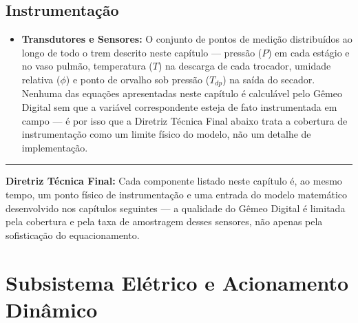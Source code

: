 \documentclass[12pt,a4paper]{article}
\numberwithin{equation}{section}
\numberwithin{table}{section}
\numberwithin{figure}{section}
\begin{document}
	\subsection{\textbf{Instrumentação}}
	\begin{itemize}
		\item \textbf{Transdutores e Sensores:} O conjunto de pontos de medição distribuídos ao longo de todo o trem descrito neste capítulo — pressão ($P$) em cada estágio e no vaso pulmão, temperatura ($T$) na descarga de cada trocador, umidade relativa ($\phi$) e ponto de orvalho sob pressão ($T_{dp}$) na saída do secador. Nenhuma das equações apresentadas neste capítulo é calculável pelo Gêmeo Digital sem que a variável correspondente esteja de fato instrumentada em campo — é por isso que a Diretriz Técnica Final abaixo trata a cobertura de instrumentação como um limite físico do modelo, não um detalhe de implementação.
	\end{itemize}

	\vspace{1em}
	\hrule
	\vspace{1em}

	\textbf{Diretriz Técnica Final:} Cada componente listado neste capítulo é, ao mesmo tempo, um ponto físico de instrumentação e uma entrada do modelo matemático desenvolvido nos capítulos seguintes — a qualidade do Gêmeo Digital é limitada pela cobertura e pela taxa de amostragem desses sensores, não apenas pela sofisticação do equacionamento.

	
	
	\clearpage
	\section{\textbf{Subsistema Elétrico e Acionamento Dinâmico}}

\end{document}
